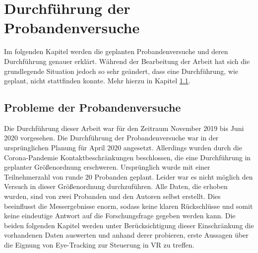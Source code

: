 
\chapter{Durchführung  der Probandenversuche} 

Im folgenden Kapitel werden die geplanten Probandenversuche und deren Durchführung genauer erklärt. Während der Bearbeitung der Arbeit hat sich die grundlegende Situation jedoch so sehr geändert, dass eine Durchführung, wie geplant, nicht stattfinden konnte. Mehr hierzu in Kapitel \ref{section:corona}.

\section{Probleme der Probandenversuche}
\label{section:corona}
Die Durchführung dieser Arbeit war für den Zeitraum November 2019 bis Juni 2020 vorgesehen. Die Durchführung der Probandenversuche war in der ursprünglichen Planung für April 2020 angesetzt. Allerdings wurden durch die Corona-Pandemie  Kontaktbeschränkungen beschlossen, die eine Durchführung in geplanter Größenordnung erschweren. Ursprünglich wurde mit einer Teilnehmerzahl von runde 20 Probanden geplant. Leider war es nicht möglich den Versuch in dieser Größenordnung durchzuführen. Alle Daten, die erhoben wurden, sind von zwei Probanden und den Autoren selbst erstellt. Dies beeinflusst die Messergebnisse enorm, sodass keine klaren Rückschlüsse und somit keine eindeutige Antwort auf die Forschungsfrage gegeben werden kann. Die beiden folgenden Kapitel werden unter Berücksichtigung dieser Einschränkung die vorhandenen Daten auswerten und anhand derer probieren, erste Aussagen über die Eignung von Eye-Tracking zur Steuerung in VR zu treffen.

